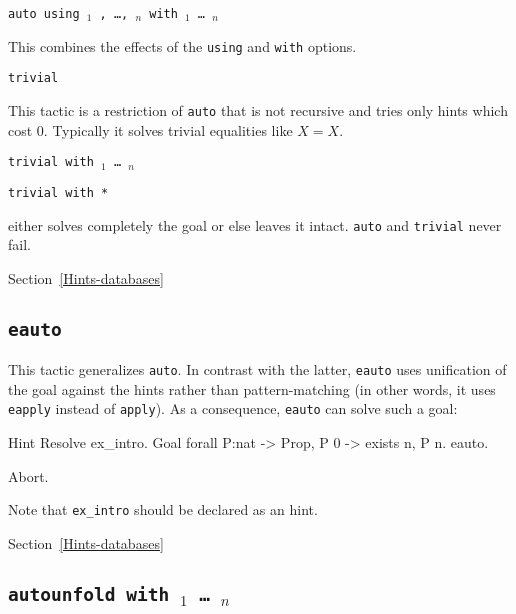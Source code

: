 \begin{coq_example*}
\begin{Variants}
\item \texttt{auto using $_1$ , \ldots , $_n$ with \ident$_1$ \dots\ \ident$_n$}

  This combines the effects of the {\tt using} and {\tt with} options.

\item {\tt trivial}

  This tactic is a restriction of {\tt auto} that is not recursive and
  tries only hints which cost 0. Typically it solves trivial
  equalities like $X=X$.

\item \texttt{trivial with \ident$_1$ \dots\ \ident$_n$}

\item \texttt{trivial with *}

\end{Variants}

 either solves completely the goal or else leaves it
intact. \texttt{auto} and \texttt{trivial} never fail.

\SeeAlso Section~\ref{Hints-databases}

\subsection{\tt eauto
\label{eauto}}

This tactic generalizes {\tt auto}. In contrast with
the latter, {\tt eauto} uses unification of the goal
against the hints rather than pattern-matching
(in other words, it uses {\tt eapply} instead of
{\tt apply}).
As a consequence, {\tt eauto} can solve such a goal:

\begin{coq_example}
Hint Resolve ex_intro.
Goal forall P:nat -> Prop, P 0 ->  exists n, P n.
eauto.
\end{coq_example}
\begin{coq_eval}
Abort.
\end{coq_eval}

Note that {\tt ex\_intro} should be declared as an
hint.

\SeeAlso Section~\ref{Hints-databases}

\subsection{\tt autounfold with  \ident$_1$ \dots\ \ident$_n$
\label{autounfold}}


\end{coq_example*}
